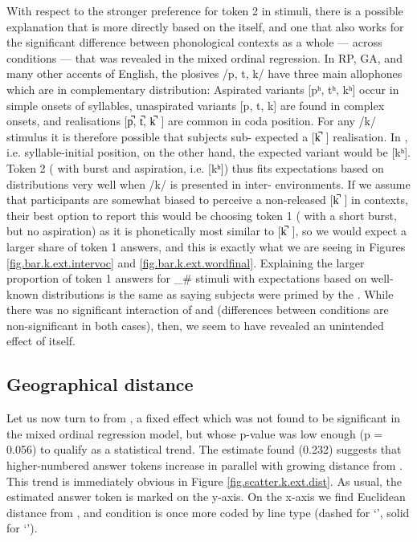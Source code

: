 With respect to the stronger preference for token 2 in  stimuli, there is a possible explanation that is more directly based on the  itself, and one that also works for the significant difference between phonological contexts as a whole --- across  conditions --- that was revealed in the mixed ordinal regression.
In RP, GA, and many other accents of English, the  plosives /p, t, k/ have three main allophones which are in complementary distribution: Aspirated variants [pʰ, tʰ, kʰ] occur in simple onsets of syllables, unaspirated variants [p, t, k] are found in complex onsets, and  realisations [p̚, t̚, k̚~] are common in coda position.
For any  /k/ stimulus it is therefore possible that subjects sub- expected a [k̚~] realisation.
In , i.e. syllable-initial position, on the other hand, the expected variant would be [kʰ].
Token 2 ( with burst and aspiration, i.e. [kʰ]) thus fits expectations based on  distributions very well when /k/ is presented in inter- environments.
If we assume that participants are somewhat biased to perceive a non-released [k̚~] in  contexts, their best option to report this  would be choosing token 1 ( with a short burst, but no aspiration) as it is phonetically most similar to [k̚~], so we would expect a larger share of token 1 answers, and this is exactly what we are seeing in Figures \ref{fig.bar.k.ext.intervoc} and \ref{fig.bar.k.ext.wordfinal}.
Explaining the larger proportion of token 1 answers for \_\# stimuli with expectations based on well-known  distributions is the same as saying subjects were primed by the .
While there was no significant interaction of  and  (differences between conditions are non-significant in both cases), then, we seem to have revealed an unintended  effect of  itself.

\subsection{Geographical distance}
\label{sec.perc_res.k.geography}

Let us now turn to  from , a fixed effect which was not found to be significant in the mixed ordinal regression model, but whose p-value was low enough (p = 0.056) to qualify as a statistical trend.
The estimate found (0.232) suggests that higher-numbered answer tokens increase in parallel with growing distance from .
This trend is immediately obvious in Figure \ref{fig.scatter.k.ext.dist}.
As usual, the estimated answer token is marked on the y-axis.
On the x-axis we find Euclidean distance from , and  condition is once more coded by line type (dashed for `', solid for `').

